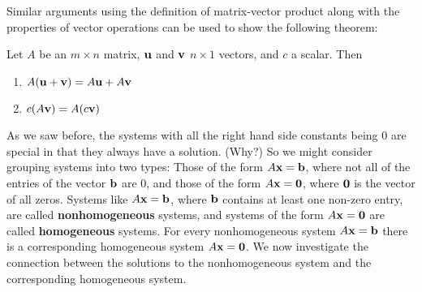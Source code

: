 Similar arguments using the definition of matrix-vector product along with the properties of vector operations can be used to show the following theorem:


\begin{theorem} \label{thm:IMT_1_e} Let $A$ be an $m \times n$ matrix, $\mathbf{u}$ and $\mathbf{v}$ $n \times 1$ vectors, and $c$ a scalar. Then
\begin{enumerate}
\item $A(\mathbf{u} + \mathbf{v}) = A\mathbf{u} + A\mathbf{v}$
\item $c(A\mathbf{v}) = A(c\mathbf{v})$
\end{enumerate}
\end{theorem}

\label{sec:homog_sys}

As we saw before, the systems with all the right hand side constants being 0 are special in that they always have a solution. (Why?) So we might consider grouping systems into two types: Those of the form $A \mathbf{x} = \mathbf{b}$, where not all of the entries of the vector $\mathbf{b}$ are $0$, and those of the form $A \mathbf{x} = \mathbf{0}$, where $\mathbf{0}$ is the vector of all zeros. Systems like $A \mathbf{x} = \mathbf{b}$, where $\mathbf{b}$ contains at least one non-zero entry, are called \textbf{nonhomogeneous} systems, and systems of the form $A \mathbf{x} = \mathbf{0}$ are called \textbf{homogeneous} systems. For every nonhomogeneous system $A \mathbf{x} = \mathbf{b}$ there is a corresponding homogeneous system $A \mathbf{x} = \mathbf{0}$. We now investigate the connection between the solutions to the nonhomogeneous system and the corresponding homogeneous system. 

\vspace{0.2cm}

